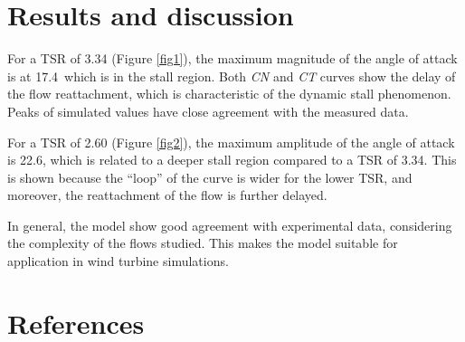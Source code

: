 \documentclass[a4paper]{jpconf}
\begin{document}
\newpage

\section{Results and discussion}

For a TSR of 3.34 (Figure \ref{fig1}), the maximum magnitude of the angle of attack is at
17.4\degree\ which is in the stall region. Both \textit{CN} and \textit{CT} curves show the delay
of the flow reattachment, which is characteristic of the dynamic stall
phenomenon. Peaks of simulated values have close agreement with the measured
data.

For a TSR of 2.60 (Figure \ref{fig2}), the maximum amplitude of the angle of attack is 22.6\degree, which
is related to a deeper stall region compared to a TSR of 3.34. This is shown
because the ``loop'' of the curve is wider for the lower TSR, and moreover, the
reattachment of the flow is further delayed.

In general, the model show good agreement with experimental data, considering the complexity
of the flows studied. This makes the model suitable for application in wind turbine
simulations.


\section*{References}

{}

\end{document}
